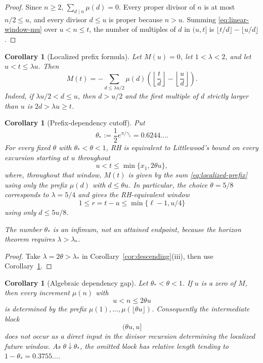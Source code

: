 \documentclass[11pt]{amsart}
\numberwithin{equation}{section}
\theoremstyle{plain}
\newtheorem{corollary}[theorem]{Corollary}
\theoremstyle{definition}
\theoremstyle{remark}
\begin{document}
\begin{proof}
Since $n\ge2$, $\sum_{d\mid n}\mu(d)=0$. Every proper divisor of $n$ is at
most $n/2\le u$, and every divisor $d\le u$ is proper because $n>u$. Summing
\eqref{eq:linear-window-mu} over $u<n\le t$, the number of multiples of $d$
in $(u,t]$ is $\lfloor t/d\rfloor-\lfloor u/d\rfloor$.
\end{proof}

\begin{corollary}[Localized prefix formula]
\label{cor:localized-prefix}
Let $M(u)=0$, let $1<\lambda<2$, and let $u<t\le\lambda u$.  Then
\begin{equation}
\label{eq:localized-prefix}
M(t)=-\sum_{d\le\lambda u/2}\mu(d)
\left(\left\lfloor\frac td\right\rfloor-
\left\lfloor\frac ud\right\rfloor\right).
\end{equation}
Indeed, if $\lambda u/2<d\le u$, then $d>u/2$ and the first multiple of
$d$ strictly larger than $u$ is $2d>\lambda u\ge t$.
\end{corollary}

\begin{corollary}[Prefix-dependency cutoff]
\label{cor:prefix-cutoff}
Put
\[
\theta_*:=\frac12e^{\pi/\gamma_1}=0.6244\ldots .
\]
For every fixed $\theta$ with $\theta_*<\theta<1$, RH is equivalent to
Littlewood's bound on every excursion starting at $u$ throughout
\[
u<t\le\min\{x_1,2\theta u\},
\]
where, throughout that window, $M(t)$ is given by the sum
\eqref{eq:localized-prefix} using only the prefix
$\mu(d)$ with $d\le\theta u$.  In particular, the choice
$\theta=5/8$ corresponds to $\lambda=5/4$ and gives the RH-equivalent
window
\[
1\le r=t-u\le\min\{\ell-1,u/4\}
\]
using only $d\le5u/8$.

The number $\theta_*$ is an infimum, not an attained endpoint, because the
horizon theorem requires $\lambda>\lambda_*$.
\end{corollary}

\begin{proof}
Take $\lambda=2\theta>\lambda_*$ in
Corollary~\ref{cor:descending}(iii), then use
Corollary~\ref{cor:localized-prefix}.
\end{proof}


\begin{corollary}[Algebraic dependency gap]
\label{cor:dependency-gap}
Let $\theta_*<\theta<1$.  If $u$ is a zero of $M$, then every increment
$\mu(n)$ with
\[
u<n\le2\theta u
\]
is determined by the prefix
$\mu(1),\ldots,\mu(\lfloor\theta u\rfloor)$.  Consequently the intermediate
block
\[
(\theta u,u]
\]
does not occur as a direct input in the divisor recursion determining the
localized future window.  As $\theta\downarrow\theta_*$, the omitted block
has relative length tending to
$1-\theta_*=0.3755\ldots$.
\end{corollary}
\end{document}
